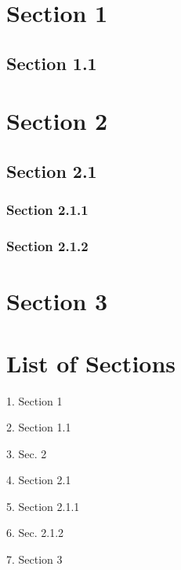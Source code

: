 \hypertarget{sec:1}{%
\section{Section 1}\label{sec:1}}

\hypertarget{sec:11}{%
\subsection{Section 1.1}\label{sec:11}}

\hypertarget{sec:2}{%
\section{Section 2}\label{sec:2}}

\hypertarget{sec:21}{%
\subsection{Section 2.1}\label{sec:21}}

\hypertarget{sec:211}{%
\subsubsection{Section 2.1.1}\label{sec:211}}

\hypertarget{sec:212}{%
\subsubsection{Section 2.1.2}\label{sec:212}}

\hypertarget{section-3}{%
\section{Section 3}\label{section-3}}

\section{List of Sections}

1. Section 1

2. Section 1.1

3. Sec. 2

4. Section 2.1

5. Section 2.1.1

6. Sec. 2.1.2

7. Section 3
